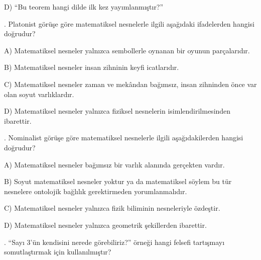 \par\noindent\hspace*{1.6em}D) “Bu teorem hangi dilde ilk kez yayımlanmıştır?”

\par\smallskip{}. Platonist görüşe göre matematiksel nesnelerle ilgili aşağıdaki ifadelerden hangisi doğrudur?

\par\noindent\hspace*{1.6em}A) Matematiksel nesneler yalnızca sembollerle oynanan bir oyunun parçalarıdır.

\par\noindent\hspace*{1.6em}B) Matematiksel nesneler insan zihninin keyfi icatlarıdır.

\par\noindent\hspace*{1.6em}C) Matematiksel nesneler zaman ve mekândan bağımsız, insan zihninden önce var olan soyut varlıklardır.

\par\noindent\hspace*{1.6em}D) Matematiksel nesneler yalnızca fiziksel nesnelerin isimlendirilmesinden ibarettir.

\par\smallskip{}. Nominalist görüşe göre matematiksel nesnelerle ilgili aşağıdakilerden hangisi doğrudur?

\par\noindent\hspace*{1.6em}A) Matematiksel nesneler bağımsız bir varlık alanında gerçekten vardır.

\par\noindent\hspace*{1.6em}B) Soyut matematiksel nesneler yoktur ya da matematiksel söylem bu tür nesnelere ontolojik bağlılık gerektirmeden yorumlanmalıdır.

\par\noindent\hspace*{1.6em}C) Matematiksel nesneler yalnızca fizik biliminin nesneleriyle özdeştir.

\par\noindent\hspace*{1.6em}D) Matematiksel nesneler yalnızca geometrik şekillerden ibarettir.

\par\smallskip{}. “Sayı 3’ün kendisini nerede görebiliriz?” örneği hangi felsefi tartışmayı somutlaştırmak için kullanılmıştır?

